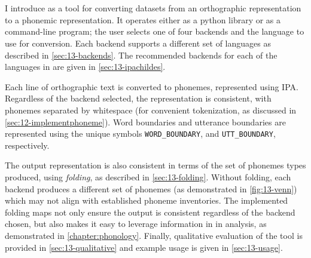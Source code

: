 
\section{\gpp}

I introduce \gpp as a tool for converting datasets from an orthographic representation to a phonemic representation. It operates either as a python library or as a command-line program; the user selects one of four backends and the language to use for conversion. Each backend supports a different set of languages as described in \cref{sec:13-backends}. The recommended backends for each of the languages in \ipachildes are given in \cref{sec:13-ipachildes}.

Each line of orthographic text is converted to phonemes, represented using IPA. Regardless of the backend selected, the representation is consistent, with phonemes separated by whitespace (for convenient tokenization, as discussed in \cref{sec:12-implementphoneme}). Word boundaries and utterance boundaries are represented using the unique symbols \texttt{WORD\_BOUNDARY}, and \texttt{UTT\_BOUNDARY}, respectively. 

The output representation is also consistent in terms of the set of phonemes types produced, using \emph{folding}, as described in \cref{sec:13-folding}. Without folding, each backend produces a different set of phonemes (as demonstrated in \cref{fig:13-venn}) which may not align with established phoneme inventories. The implemented folding maps not only ensure the output is consistent regardless of the backend chosen, but also makes it easy to leverage information in \phoible in analysis, as demonstrated in \cref{chapter:phonology}. Finally, qualitative evaluation of the tool is provided in \cref{sec:13-qualitative} and example usage is given in \cref{sec:13-usage}.


